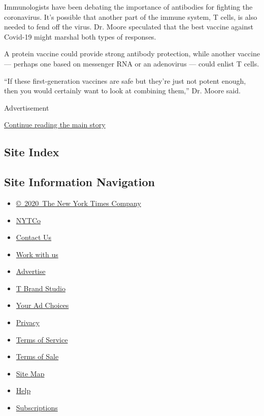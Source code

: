 Immunologists have been debating the importance of antibodies for
fighting the coronavirus. It's possible that another part of the immune
system, T cells, is also needed to fend off the virus. Dr. Moore
speculated that the best vaccine against Covid-19 might marshal both
types of responses.

A protein vaccine could provide strong antibody protection, while
another vaccine --- perhaps one based on messenger RNA or an adenovirus
--- could enlist T cells.

``If these first-generation vaccines are safe but they're just not
potent enough, then you would certainly want to look at combining
them,'' Dr. Moore said.

Advertisement

\protect\hyperlink{after-bottom}{Continue reading the main story}

\hypertarget{site-index}{%
\subsection{Site Index}\label{site-index}}

\hypertarget{site-information-navigation}{%
\subsection{Site Information
Navigation}\label{site-information-navigation}}

\begin{itemize}
\tightlist
\item
  \href{https://help.nytimes3xbfgragh.onion/hc/en-us/articles/115014792127-Copyright-notice}{©~2020~The
  New York Times Company}
\end{itemize}

\begin{itemize}
\tightlist
\item
  \href{https://www.nytco.com/}{NYTCo}
\item
  \href{https://help.nytimes3xbfgragh.onion/hc/en-us/articles/115015385887-Contact-Us}{Contact
  Us}
\item
  \href{https://www.nytco.com/careers/}{Work with us}
\item
  \href{https://nytmediakit.com/}{Advertise}
\item
  \href{http://www.tbrandstudio.com/}{T Brand Studio}
\item
  \href{https://www.nytimes3xbfgragh.onion/privacy/cookie-policy\#how-do-i-manage-trackers}{Your
  Ad Choices}
\item
  \href{https://www.nytimes3xbfgragh.onion/privacy}{Privacy}
\item
  \href{https://help.nytimes3xbfgragh.onion/hc/en-us/articles/115014893428-Terms-of-service}{Terms
  of Service}
\item
  \href{https://help.nytimes3xbfgragh.onion/hc/en-us/articles/115014893968-Terms-of-sale}{Terms
  of Sale}
\item
  \href{https://spiderbites.nytimes3xbfgragh.onion}{Site Map}
\item
  \href{https://help.nytimes3xbfgragh.onion/hc/en-us}{Help}
\item
  \href{https://www.nytimes3xbfgragh.onion/subscription?campaignId=37WXW}{Subscriptions}
\end{itemize}
